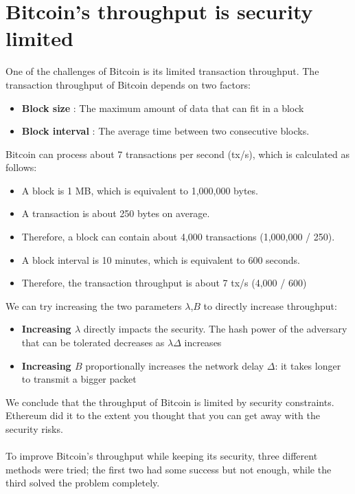\documentclass{report}
\begin{document}
\section{Bitcoin’s throughput is security limited}
One of the challenges of Bitcoin is its limited transaction throughput. The transaction throughput of Bitcoin depends on two factors:
\begin{itemize}
	\item \textbf{Block size} :  The maximum amount of data that can fit in a block
	\item \textbf{Block interval} : The average time between two consecutive blocks.
\end{itemize} 
Bitcoin can process about 7 transactions per second (tx/s), which is calculated as follows:
\begin{itemize}
	\item A block is 1 MB, which is equivalent to 1,000,000 bytes.
	\item A transaction is about 250 bytes on average.
	\item Therefore, a block can contain about 4,000 transactions (1,000,000 / 250).
	\item A block interval is 10 minutes, which is equivalent to 600 seconds.
	\item Therefore, the transaction throughput is about 7 tx/s (4,000 / 600)
\end{itemize}
We can try increasing the two parameters $\lambda$,$B$ to directly increase throughput:
\begin{itemize}
	\item \textbf{Increasing $\lambda$} directly impacts the security. The hash power of the adversary that can be tolerated
	decreases as $\lambda\Delta$ increases
	\item \textbf{Increasing $B$} proportionally increases the network delay $\Delta$: it takes longer to transmit
	a bigger packet
\end{itemize}
We conclude that the throughput of Bitcoin is limited by security constraints.
Ethereum did it to the extent you thought that you can get away with the security risks.\\\\
To improve Bitcoin’s throughput while keeping its security, three different methods were tried; the first two had some success but not enough, while the third solved the problem completely.
\end{document}
